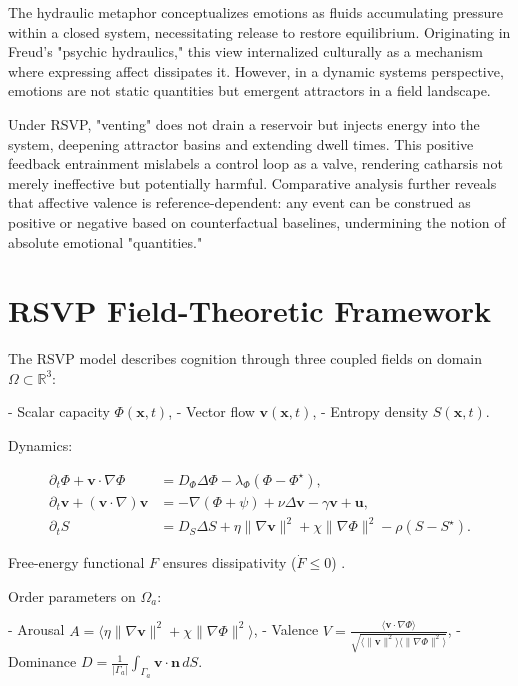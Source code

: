\documentclass[11pt]{article}
\theoremstyle{plain}
\begin{document}
The hydraulic metaphor conceptualizes emotions as fluids accumulating pressure within a closed system, necessitating release to restore equilibrium. Originating in Freud's "psychic hydraulics," this view internalized culturally as a mechanism where expressing affect dissipates it. However, in a dynamic systems perspective, emotions are not static quantities but emergent attractors in a field landscape.

Under RSVP, "venting" does not drain a reservoir but injects energy into the system, deepening attractor basins and extending dwell times. This positive feedback entrainment mislabels a control loop as a valve, rendering catharsis not merely ineffective but potentially harmful. Comparative analysis further reveals that affective valence is reference-dependent: any event can be construed as positive or negative based on counterfactual baselines, undermining the notion of absolute emotional "quantities."

\section{RSVP Field-Theoretic Framework}

The RSVP model describes cognition through three coupled fields on domain \(\Omega \subset \mathbb{R}^3\):

- Scalar capacity \(\Phi(\mathbf{x}, t)\),
- Vector flow \(\mathbf{v}(\mathbf{x}, t)\),
- Entropy density \(S(\mathbf{x}, t)\).

Dynamics:

\begin{align}
\partial_t \Phi + \mathbf{v} \cdot \nabla \Phi &= D_\Phi \Delta \Phi - \lambda_\Phi (\Phi - \Phi^\star), \\
\partial_t \mathbf{v} + (\mathbf{v} \cdot \nabla) \mathbf{v} &= -\nabla (\Phi + \psi) + \nu \Delta \mathbf{v} - \gamma \mathbf{v} + \mathbf{u}, \\
\partial_t S &= D_S \Delta S + \eta \|\nabla \mathbf{v}\|^2 + \chi \|\nabla \Phi\|^2 - \rho (S - S^\star).
\end{align}

Free-energy functional \(F\) ensures dissipativity (\(\dot{F} \leq 0\)) \citep{Kretzmann1982}.

Order parameters on \(\Omega_a\):

- Arousal \(A = \langle \eta \|\nabla \mathbf{v}\|^2 + \chi \|\nabla \Phi\|^2 \rangle\),
- Valence \(V = \frac{\langle \mathbf{v} \cdot \nabla \Phi \rangle}{\sqrt{\langle \|\mathbf{v}\|^2 \rangle \langle \|\nabla \Phi\|^2 \rangle}}\),
- Dominance \(D = \frac{1}{|\Gamma_a|} \int_{\Gamma_a} \mathbf{v} \cdot \mathbf{n} \, dS\).
\end{document}
